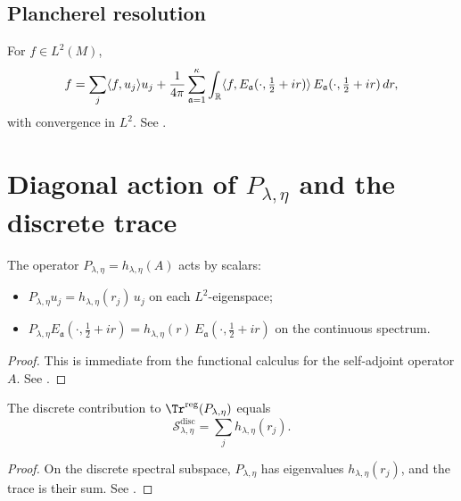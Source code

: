 \subsection{Plancherel resolution}\label{subsec:ch7-plancherel}

For $f\in L^2(M)$,
\begin{equation}\label{eq:7.plancherel}
f=\sum_j \langle f,u_j\rangle u_j
+\frac{1}{4\pi}\sum_{\mathfrak a=1}^\kappa \int_{\mathbb{R}}
\langle f,E_{\mathfrak a}(\cdot,\tfrac12+ir)\rangle\,E_{\mathfrak a}(\cdot,\tfrac12+ir)\,dr,
\end{equation}
with convergence in $L^2$. See \cite{Hejhal1983,Iwaniec2002}.

\section{Diagonal action of $P_{\lambda,\eta}$ and the discrete trace}\label{sec:ch7-diagonal}

\begin{lemma}\label{lem:7.diagonal.action}
The operator $P_{\lambda,\eta}=h_{\lambda,\eta}(A)$ acts by scalars:
\begin{itemize}
\item $P_{\lambda,\eta}u_j=h_{\lambda,\eta}(r_j)\,u_j$ on each $L^2$-eigenspace;
\item $P_{\lambda,\eta}E_{\mathfrak a}(\cdot,\tfrac12+ir)=h_{\lambda,\eta}(r)\,E_{\mathfrak a}(\cdot,\tfrac12+ir)$ on the continuous spectrum.
\end{itemize}
\end{lemma}

\begin{proof}
This is immediate from the functional calculus for the self-adjoint operator $A$. See \cite{Hormander1983,Sogge2014}.
\end{proof}

\begin{proposition}\label{prop:7.discrete.trace}
The discrete contribution to $\Tr^{\mathrm{reg}}(P_{\lambda,\eta})$ equals
\begin{equation}\label{eq:7.S.disc}
\mathcal S^{\mathrm{disc}}_{\lambda,\eta}=\sum_{j} h_{\lambda,\eta}(r_j).
\end{equation}
\end{proposition}

\begin{proof}
On the discrete spectral subspace, $P_{\lambda,\eta}$ has eigenvalues $h_{\lambda,\eta}(r_j)$, and the trace is their sum.
See \cite{Hejhal1983,Iwaniec2002}.
\end{proof}


